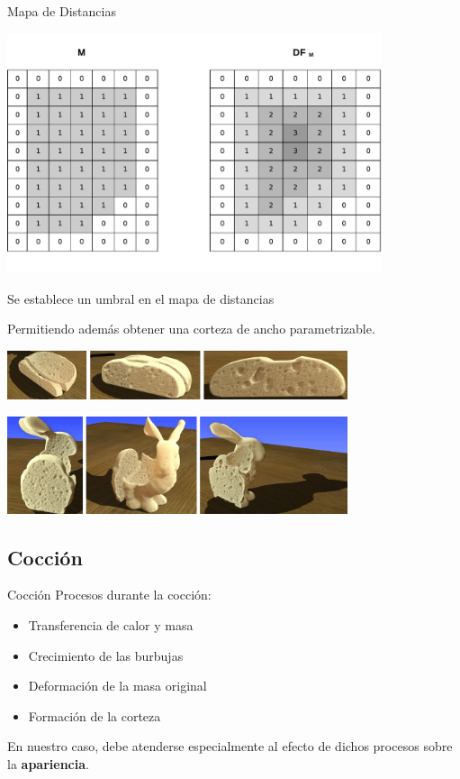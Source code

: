 \documentclass[spanish]{beamer}
\begin{document}
\begin{frame}{Mapa de Distancias}

\centerline{\includegraphics[width=11cm]{../figures/DistanceTransform}}

\end{frame}

\begin{frame}
Se establece un umbral en el mapa de distancias

Permitiendo además obtener una corteza de ancho parametrizable.


\centerline{\includegraphics[width=10cm]{../figures/prebakebread}}
\centerline{\includegraphics[width=10cm]{../figures/prebakebunny}}
\end{frame}

\subsection{Cocción}

\begin{frame}{Cocción}
Procesos durante la cocción:

\begin{itemize}
\item Transferencia de calor y masa
\item Crecimiento de las burbujas
\item Deformación de la masa original
\item Formación de la corteza
\end{itemize}

En nuestro caso, debe atenderse especialmente al efecto de dichos procesos sobre la \textbf{apariencia}.

\end{frame}
\end{document}
